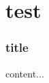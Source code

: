 \documentclass[compress]{beamer}
\begin{document}
\section{test}
\begin{frame}
\frametitle{title}
content...
\end{frame}
\end{document}
